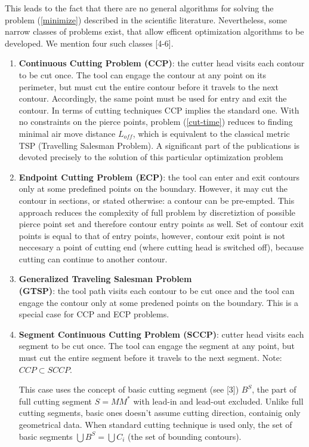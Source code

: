 \documentclass{ifacconf}
\begin{document}
This leads to the fact that
there are no general algorithms for solving the problem (\ref{minimize})
described in the scientific literature.
Nevertheless,
some narrow classes of problems
exist,
that allow efficent optimization algorithms to be developed.
We mention four such classes [4-6].

\begin{enumerate}
    \item \textbf{Continuous Cutting Problem (CCP)}:
    the cutter head visits each contour to be cut once.
    The tool can engage the contour at any point on its perimeter,
    but must cut the entire
    contour before it travels to the next contour.
    Accordingly, the same point must be used for
    entry and exit the contour.
    In terms of cutting techniques CCP implies the standard one.
    With no constraints on the pierce points,
    problem (\ref{cut-time}) reduces to finding minimal
    air move distance $L_{off}$,
    which is equivalent to the classical metric TSP
    (Travelling Salesman Problem).
    A significant part of the publications is devoted precisely
    to the solution of this particular optimization problem
    \item \textbf{Endpoint Cutting Problem (ECP)}:
    the tool can enter and exit contours only at some
    predefined points on the boundary.
    However, it may cut the contour in sections,
    or stated otherwise: a contour can be pre-empted.
    This approach reduces the complexity of full problem
    by discretiztion of possible pierce point set and therefore
    contour entry points as well.
    Set of contour exit points is equal to that of
    entry points, however,
    contour exit point is not neccesary
    a point of cutting end
    (where cutting head is switched off),
    because cutting can continue to another contour.
    \item \textbf{Generalized Traveling Salesman Problem \\ (GTSP)}:
    the tool path visits each contour to be cut once
    and the tool can engage the contour only
    at some predened points on the boundary.
    This is a special case for CCP and ECP problems.
    \item \textbf{Segment Continuous Cutting Problem (SCCP)}:
    cutter head visits each segment to be cut once.
    The tool can engage the segment at any point,
    but must cut the entire segment before it travels to the next segment.
    Note: $CCP \subset SCCP$.

    This case uses the concept of basic cutting segment
    (see [3])
    $B^S$, the part of full cutting segment
    $S = MM^*$ with lead-in and lead-out excluded.
    Unlike full cutting segments,
    basic ones doesn't assume cutting direction,
    containig only geometrical data.
    When standard cutting technique is used only,
    the set of basic segments $\bigcup B^S = \bigcup C_i$
    (the set of bounding contours).
\end{enumerate}
\end{document}
